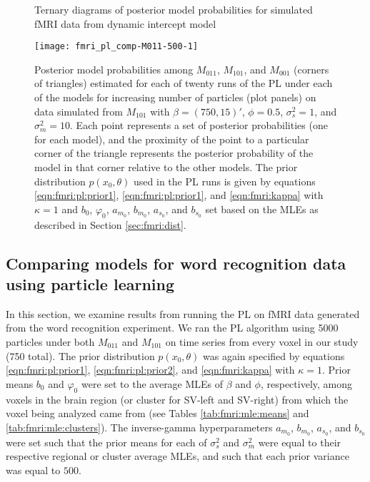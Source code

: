\begin{figure}
\ssp
\centering
\caption{Ternary diagrams of posterior model probabilities for simulated fMRI data from dynamic intercept model} \label{fig:fmri:comp:M101}
\texttt{[image: fmri\_pl\_comp-M011-500-1]}
\caption*{Posterior model probabilities among $M_{011}$, $M_{101}$, and $M_{001}$ (corners of triangles) estimated for each of twenty runs of the PL under each of the models for increasing number of particles (plot panels) on data simulated from $M_{101}$ with $\beta = (750,15)'$, $\phi = 0.5$, $\sigma^2_s = 1$, and $\sigma^2_m = 10$. Each point represents a set of posterior probabilities (one for each model), and the proximity of the point to a particular corner of the triangle represents the posterior probability of the model in that corner relative to the other models. The prior distribution $p(x_0,\theta)$ used in the PL runs is given by equations \eqref{eqn:fmri:pl:prior1}, \eqref{eqn:fmri:pl:prior1}, and \eqref{eqn:fmri:kappa} with $\kappa = 1$ and $b_0$, $\varphi_0$, $a_{m_0}$, $b_{m_0}$, $a_{s_0}$, and $b_{s_0}$ set based on the MLEs as described in Section \ref{sec:fmri:dist}.}
\end{figure}

\subsection{Comparing models for word recognition data using particle learning \label{sec:fmri:real}}

In this section, we examine results from running the PL on fMRI data generated from the word recognition experiment. We ran the PL algorithm using 5000 particles under both $M_{011}$ and $M_{101}$ on time series from every voxel in our study (750 total). The prior distribution $p(x_0,\theta)$ was again specified by equations \eqref{eqn:fmri:pl:prior1}, \eqref{eqn:fmri:pl:prior2}, and \eqref{eqn:fmri:kappa} with $\kappa = 1$. Prior means $b_0$ and $\varphi_0$ were set to the average MLEs of $\beta$ and $\phi$, respectively, among voxels in the brain region (or cluster for SV-left and SV-right) from which the voxel being analyzed came from (see Tables \ref{tab:fmri:mle:means} and \ref{tab:fmri:mle:clusters}). The inverse-gamma hyperparameters $a_{m_0}$, $b_{m_0}$, $a_{s_0}$, and $b_{s_0}$ were set such that the prior means for each of $\sigma^2_s$ and $\sigma^2_m$ were equal to their respective regional or cluster average MLEs, and such that each prior variance was equal to $500$.

